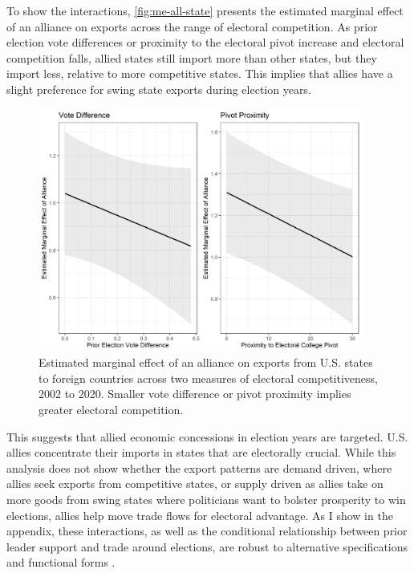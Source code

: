 \documentclass[12pt]{article}
\begin{document}
To show the interactions, \autoref{fig:me-all-state} presents the estimated marginal effect of an alliance on exports across the range of electoral competition. 
As prior election vote differences or proximity to the electoral pivot increase and electoral competition falls, allied states still import more than other states, but they import less, relative to more competitive states. 
This implies that allies have a slight preference for swing state exports during election years. 


\begin{figure}[htpb]
	\centering
		\includegraphics[width=0.95\textwidth]{../figures/me-all-state.png}
	\caption{Estimated marginal effect of an alliance on exports from U.S. states to foreign countries across two measures of electoral competitiveness, 2002 to 2020. Smaller vote difference or pivot proximity implies greater electoral competition.}
	\label{fig:me-all-state}
\end{figure}


This suggests that allied economic concessions in election years are targeted. 
U.S. allies concentrate their imports in states that are electorally crucial.
While this analysis does not show whether the export patterns are demand driven, where allies seek exports from competitive states, or supply driven as allies take on more goods from swing states where politicians want to bolster prosperity to win elections, allies help move trade flows for electoral advantage. 
As I show in the appendix, these interactions, as well as the conditional relationship between prior leader support and trade around elections, are robust to alternative specifications and functional forms \citep{Hainmuelleretal2019}.
\end{document}
